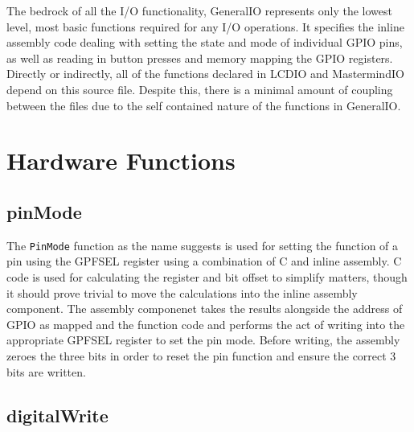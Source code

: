 \documentclass[a4paper, titlepage]{article}
\begin{document}
The bedrock of all the I/O functionality, GeneralIO represents only the lowest level, most basic functions required for any I/O operations. It specifies the inline assembly code dealing with setting the state and mode of individual GPIO pins, as well as reading in button presses and memory mapping the GPIO registers. Directly or indirectly, all of the functions declared in LCDIO and MastermindIO depend on this source file. Despite this, there is a minimal amount of coupling between the files due to the self contained nature of the functions in GeneralIO.
\pagebreak
\section{Hardware Functions}

\subsection{pinMode}

The \texttt{PinMode} function as the name suggests is used for setting the function of a pin using the GPFSEL register using a combination of C and inline assembly. C code is used for calculating the register and bit offset to simplify matters, though it should prove trivial to move the calculations into the inline assembly component. The assembly componenet takes the results alongside the address of GPIO as mapped and the function code and performs the act of writing into the appropriate GPFSEL register to set the pin mode. Before writing, the assembly zeroes the three bits in order to reset the pin function and ensure the correct 3 bits are written.

\subsection{digitalWrite}
\end{document}
